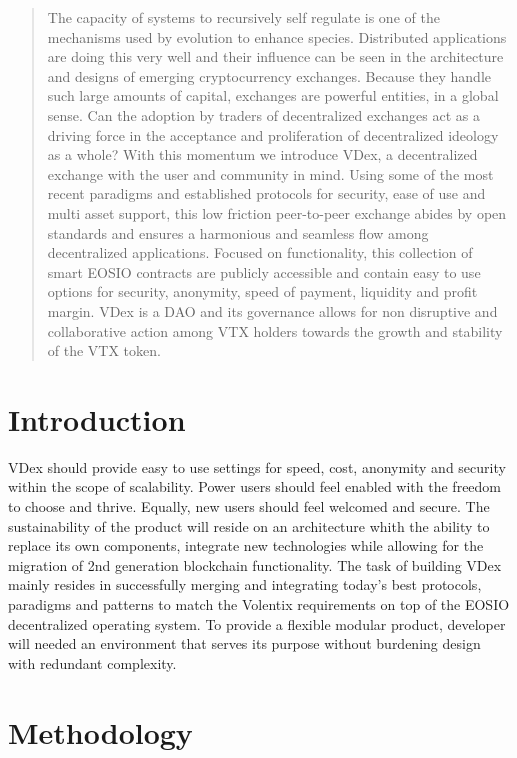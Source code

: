 \documentclass[]{article}
\begin{document}
\begin{abstract}
The capacity of systems to recursively self regulate is one of the mechanisms used by evolution to enhance species. Distributed applications are doing this very well and their influence can be seen in the architecture
and designs of emerging cryptocurrency exchanges. Because they handle such large amounts of capital, exchanges are powerful entities, in a global sense. 
Can the adoption by traders of decentralized exchanges act as a driving force in the acceptance and proliferation of decentralized ideology as a whole? 
With this momentum we introduce VDex, a decentralized exchange 
with the user and community in mind. Using some of the most recent paradigms 
and established protocols for security, ease of use and multi asset support, 
this low friction peer-to-peer exchange abides by open standards and ensures 
a harmonious and seamless flow among decentralized applications. 
Focused on functionality, this collection of smart EOSIO contracts are 
publicly accessible and contain easy to use options for security, anonymity, 
speed of payment, liquidity and profit margin.
VDex is a DAO and its governance allows for non disruptive and collaborative action among VTX holders towards the growth and stability of the VTX token.
\end{abstract}
\section{Introduction}

VDex should provide easy to use settings for speed, cost, anonymity and security within the scope of scalability. Power users should feel enabled with the freedom to choose and thrive. Equally, new users should feel welcomed and secure.
The sustainability of the product will reside on an architecture 
whith the ability to replace its own components, integrate new technologies while allowing for the migration of 2nd generation blockchain functionality.  
The task of building VDex mainly resides in successfully merging
and integrating today's best protocols, paradigms and patterns to match the 
Volentix requirements on top of the EOSIO decentralized operating system.
To provide a flexible modular product, developer will needed an environment that serves its purpose without burdening design with redundant complexity. 
 	
\section{Methodology}
\end{document}
